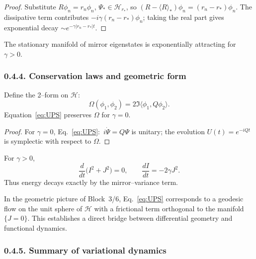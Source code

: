 \begin{proof}
Substitute $R\phi_n=r_n\phi_n$, $\Psi_*\in\mathcal{H}_{r_*}$, so $(R-\langle R\rangle_*)\phi_n=(r_n-r_*)\phi_n$.
The dissipative term contributes $-i\gamma(r_n-r_*)\phi_n$;
taking the real part gives exponential decay $\sim e^{-\gamma|r_n-r_*|t}$.
\end{proof}

\begin{corollary}
The stationary manifold of mirror eigenstates is exponentially attracting for $\gamma>0$.
\end{corollary}

\subsubsection*{0.4.4. Conservation laws and geometric form}

\begin{proposition}
Define the 2–form on $\mathcal{H}$:
\[
\Omega(\phi_1,\phi_2)=2\Im\langle\phi_1,Q\phi_2\rangle.
\]
Equation~\eqref{eq:UPS} preserves $\Omega$ for $\gamma=0$.
\end{proposition}

\begin{proof}
For $\gamma=0$, Eq.~\eqref{eq:UPS}$:$ $i\dot\Psi=Q\Psi$ is unitary;
the evolution $U(t)=e^{-iQt}$ is symplectic with respect to $\Omega$.
\end{proof}

\begin{corollary}
For $\gamma>0$,
\[
\frac{d}{dt}\big(I^2+J^2\big)=0,\qquad
\frac{dI}{dt}=-2\gamma J^2.
\]
\]
Thus energy decays exactly by the mirror–variance term.
\end{corollary}

\begin{remark}
In the geometric picture of Block~3/6, Eq.~\eqref{eq:UPS} corresponds to a geodesic flow on the unit sphere of $\mathcal{H}$ with a frictional term orthogonal to the manifold $\{J=0\}$.
This establishes a direct bridge between differential geometry and functional dynamics.
\end{remark}

\subsubsection*{0.4.5. Summary of variational dynamics}

